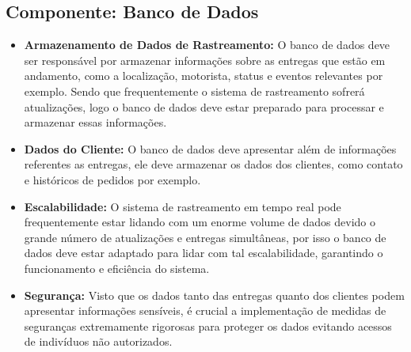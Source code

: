      \subsection{Componente: Banco de Dados}
     \begin{itemize}
     	\item \textbf{Armazenamento de Dados de Rastreamento:} O banco de dados deve ser responsável por armazenar informações sobre as entregas que estão em andamento, como a localização, motorista, status e eventos relevantes por exemplo. Sendo que frequentemente o sistema de rastreamento sofrerá atualizações, logo o banco de dados deve estar preparado para processar e armazenar essas informações.
     	
     	\item \textbf{Dados do Cliente:} O banco de dados deve apresentar além de informações referentes as entregas, ele deve armazenar os dados dos clientes, como contato e históricos de pedidos por exemplo.
     	
     	\item \textbf{Escalabilidade:} O sistema de rastreamento em tempo real pode frequentemente estar lidando com um enorme volume de dados devido o grande número de atualizações e entregas simultâneas, por isso o banco de dados deve estar adaptado para lidar com tal escalabilidade, garantindo o funcionamento e eficiência do sistema.
     	
     	\item \textbf{Segurança:} Visto que os dados tanto das entregas quanto dos clientes podem apresentar informações sensíveis, é crucial a implementação de medidas de seguranças extremamente rigorosas para proteger os dados evitando acessos de indivíduos não autorizados.
     	
     \end{itemize}

